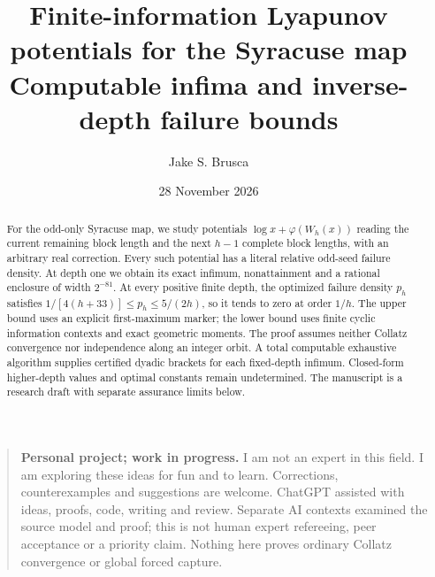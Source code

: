 \documentclass[11pt,letterpaper]{article}
\title{Finite-information Lyapunov potentials for the Syracuse map\\[0.3em]\large Computable infima and inverse-depth failure bounds}
\author{Jake S. Brusca}
\date{28 November 2026}
\begin{document}
\maketitle
\begin{abstract}
For the odd-only Syracuse map, we study potentials $\log x+\varphi(W_h(x))$
reading the current remaining block length and the next $h-1$ complete block
lengths, with an arbitrary real correction. Every such potential has a literal
relative odd-seed failure density. At depth one we obtain its exact infimum,
nonattainment and a rational enclosure of width $2^{-81}$. At every positive
finite depth, the optimized failure density $p_h$ satisfies
$1/[4(h+33)]\le p_h\le5/(2h)$, so it tends to zero at order $1/h$.
The upper bound uses an explicit first-maximum marker; the lower bound uses
finite cyclic information contexts and exact geometric moments. The proof
assumes neither Collatz convergence nor independence along an integer orbit.
A total computable exhaustive algorithm supplies certified dyadic brackets
for each fixed-depth infimum. Closed-form higher-depth values and optimal
constants remain undetermined.
The manuscript is a research draft with separate assurance limits below.
\end{abstract}

\begin{quote}\small
\textbf{Personal project; work in progress.} I am not an expert in this field.
I am exploring these ideas for fun and to learn. Corrections, counterexamples
and suggestions are welcome. ChatGPT assisted with ideas, proofs, code,
writing and review. Separate AI contexts examined the source model and proof;
this is not human expert refereeing, peer acceptance or a priority claim.
Nothing here proves ordinary Collatz convergence or global forced capture.
\end{quote}
\end{document}
